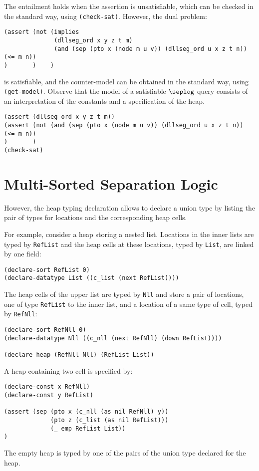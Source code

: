 \documentclass[10pt]{llncs}
\begin{document}
The entailment holds when the assertion is unsatisfiable, which can be
checked in the standard way, using 
{\tt (check-sat)}.
However, the dual problem:
\begin{Verbatim}
(assert (not (implies 
              (dllseg_ord x y z t m)
              (and (sep (pto x (node m u v)) (dllseg_ord u x z t n)) (<= m n)) 
)       )    )
\end{Verbatim}
is satisfiable, and the counter-model can be obtained in the standard
way, using {\tt (get-model)}. Observe that the model of a satisfiable
$\seplog$ query consists of an interpretation of the constants and a
specification of the heap. 

\begin{Verbatim}
(assert (dllseg_ord x y z t m))
(assert (not (and (sep (pto x (node m u v)) (dllseg_ord u x z t n)) (<= m n))
)       )
(check-sat)
\end{Verbatim}



\section{Multi-Sorted Separation Logic}
\label{sec:tsl}

However, the heap typing declaration allows to declare a union type
by listing the pair of types for locations and the corresponding 
heap cells.

For example, consider a heap storing a nested list.
Locations in the inner lists are typed by {\tt RefList} and 
the heap cells at these locations, typed by {\tt List}, 
are linked by one field:
\begin{Verbatim}
(declare-sort RefList 0)
(declare-datatype List ((c_list (next RefList))))
\end{Verbatim}
The heap cells of the upper list are typed by {\tt Nll} and 
store a pair of locations, one of type {\tt RefList} to the inner list,
and a location of a same type of cell, typed by {\tt RefNll}:
\begin{Verbatim}
(declare-sort RefNll 0)
(declare-datatype Nll ((c_nll (next RefNll) (down RefList))))

(declare-heap (RefNll Nll) (RefList List))
\end{Verbatim}
A heap containing two cell is specified by:
\begin{Verbatim}
(declare-const x RefNll)
(declare-const y RefList)

(assert (sep (pto x (c_nll (as nil RefNll) y))
             (pto z (c_list (as nil RefList)))
             (_ emp RefList List))
)
\end{Verbatim}
The empty heap is typed by one of the pairs of the union type declared
for the heap.
\end{document}

